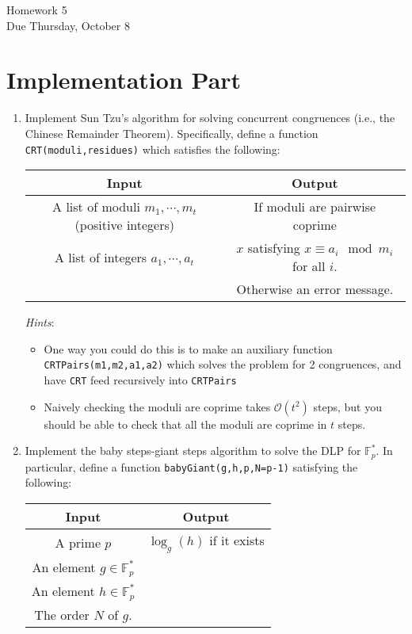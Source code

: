 \documentclass[11pt]{article}
\newcommand{\bF}{\mathbb{F}}
\newcommand{\cO}{\mathcal{O}}
\begin{document}
\begin{center}
\Large {Homework 5}\\
\small {Due Thursday, October 8}
\end{center}
\section*{Implementation Part}
\begin{enumerate}
  \item{
  Implement Sun Tzu's algorithm for solving concurrent congruences (i.e., the Chinese Remainder Theorem).  Specifically, define a function \verb|CRT(moduli,residues)| which satisfies the following:
  \begin{center}
    \begin{tabular}{c|c}
      Input & Output\\
      \hline
      A list of moduli $m_1,\cdots,m_t$ (positive integers) & If moduli are pairwise coprime\\
      A list of integers $a_1,\cdots,a_t$ &$x$ satisfying $x\equiv a_i\mod m_i$ for all $i$.\\
      &Otherwise an error message.
    \end{tabular}
  \end{center}
  \textit{Hints}:
  \begin{itemize}
    \item{One way you could do this is to make an auxiliary function \verb|CRTPairs(m1,m2,a1,a2)| which solves the problem for 2 congruences, and have \verb|CRT| feed recursively into \verb|CRTPairs|}
    \item{
    Naively checking the moduli are coprime takes $\cO(t^2)$ steps, but you should be able to check that all the moduli are coprime in $t$ steps.
    }
  \end{itemize}
  }
  \item{
  Implement the baby steps-giant steps algorithm to solve the DLP for $\bF_p^*$.  In particular, define a function \verb|babyGiant(g,h,p,N=p-1)| satisfying the following:
  \begin{center}
    \begin{tabular}{c|c}
      Input & Output\\
      \hline
      A prime $p$ & $\log_g(h)$ if it exists\\
      An element $g\in\bF_p^*$ & \\
      An element $h\in\bF_p^*$ & \\
      The order $N$ of $g$.
    \end{tabular}

\end{center}}
\end{enumerate}
\end{document}
